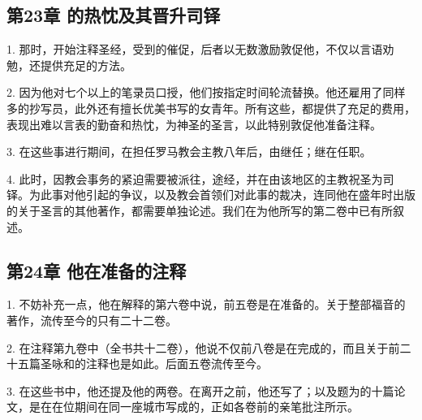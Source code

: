 
\subsection{第23章 的热忱及其晋升司铎}

1. 那时，开始注释圣经，受到的催促，后者以无数激励敦促他，不仅以言语劝勉，还提供充足的方法。\par

2. 因为他对七个以上的笔录员口授，他们按指定时间轮流替换。他还雇用了同样多的抄写员，此外还有擅长优美书写的女青年。所有这些，都提供了充足的费用，表现出难以言表的勤奋和热忱，为神圣的圣言，以此特别敦促他准备注释。\par

3. 在这些事进行期间，在担任罗马教会主教八年后，由继任；继在任职。\par

4. 此时，因教会事务的紧迫需要被派往，途经，并在由该地区的主教祝圣为司铎。为此事对他引起的争议，以及教会首领们对此事的裁决，连同他在盛年时出版的关于圣言的其他著作，都需要单独论述。我们在为他所写的第二卷中已有所叙述。\par


\subsection{第24章 他在准备的注释}

1. 不妨补充一点，他在解释的第六卷中说，前五卷是在准备的。关于整部福音的著作，流传至今的只有二十二卷。\par

2. 在注释第九卷中（全书共十二卷），他说不仅前八卷是在完成的，而且关于前二十五篇圣咏和的注释也是如此。后面五卷流传至今。\par

3. 在这些书中，他还提及他的两卷。在离开之前，他还写了；以及题为的十篇论文，是在在位期间在同一座城市写成的，正如各卷前的亲笔批注所示。\par

